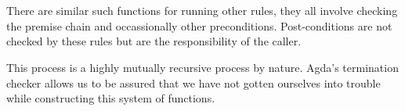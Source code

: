 \begin{code}
%
\>[572I]\AgdaSpace{}%
\AgdaSpace{}%
\AgdaSpace{}%
\AgdaSpace{}%
\<%
\\
\>[572I][@{}l@{\AgdaIndent{0}}]%
\>[20]\AgdaSymbol{(}\AgdaSpace{}%
\AgdaSpace{}%
\AgdaSymbol{(}\AgdaSpace{}%
\AgdaSymbol{(}\AgdaSpace{}%
\AgdaSymbol{)))}\<%
\\
%
\>[6]\AgdaSpace{}%
\AgdaSymbol{(}\AgdaSpace{}%
\AgdaSpace{}%
\AgdaSymbol{(}\AgdaSpace{}%
\AgdaSymbol{))}\<%
\end{code}

There are similar such functions for running other rules, they all involve
checking the premise chain and occassionally other preconditions. Post-conditions
are not checked by these rules but are the responsibility of the caller.

This process is a highly mutually recursive process by nature. Agda's termination
checker allows us to be assured that we have not gotten ourselves into trouble
while constructing this system of functions.

